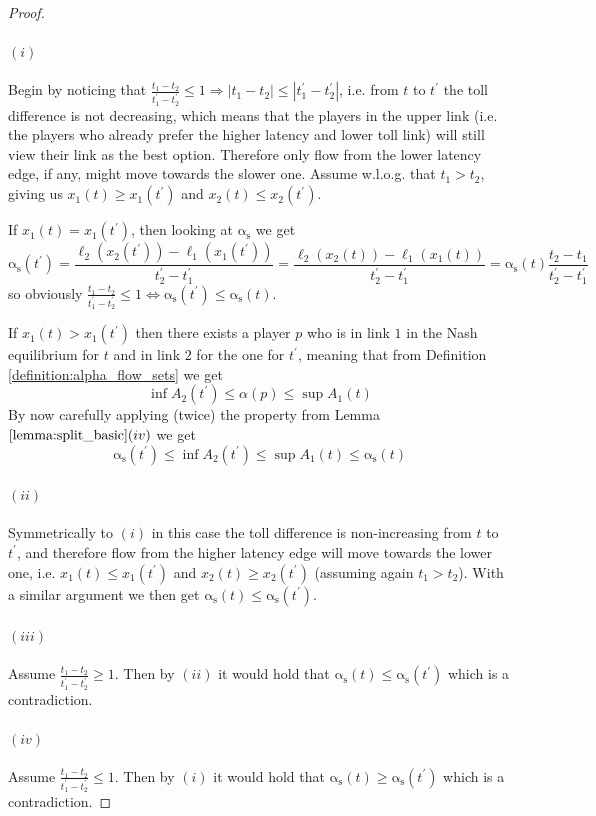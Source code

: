 \documentclass[10pt,a4paper]{book}
\newcommand{\as}{\mathrm{\alpha_s}}
\theoremstyle{definition}
\theoremstyle{comment}
\begin{document}
\begin{proof}
	$ $
	\paragraph{$(i)$}
	Begin by noticing that $\frac{t_1 - t_2}{t_1^\prime - t_2^\prime} \le 1 \Rightarrow |t_1 - t_2| \le |t_1^\prime - t_2^\prime|$, i.e. from $t$ to $t^\prime$ the toll difference is not decreasing, which means that the players in the upper link (i.e. the players who already prefer the higher latency and lower toll link) will still view their link as the best option.
	Therefore only flow from the lower latency edge, if any, might move towards the slower one.
	Assume w.l.o.g. that $t_1 > t_2$, giving us $x_1(t) \ge x_1(t^\prime)$ and $x_2(t) \le x_2(t^\prime)$.

	If $x_1(t) = x_1(t^\prime)$, then looking at $\as$ we get
	\[\as(t^\prime) = \frac{\ell_2(x_2(t^\prime)) - \ell_1(x_1(t^\prime))}{t_2^\prime - t_1^\prime} = \frac{\ell_2(x_2(t)) - \ell_1(x_1(t))}{t_2^\prime - t_1^\prime} = \as(t) \frac{t_2 - t_1}{t_2^\prime - t_1^\prime}\]
	so obviously $\frac{t_1 - t_2}{t_1^\prime - t_2^\prime} \le 1 \Leftrightarrow \as(t^\prime) \le \as(t)$.

	If $x_1(t) > x_1(t^\prime)$ then there exists a player $p$ who is in link $1$ in the Nash equilibrium for $t$ and in link $2$ for the one for $t^\prime$, meaning that from Definition \ref{definition:alpha_flow_sets} we get
	\[\inf A_2(t^\prime) \le \alpha(p) \le \sup A_1(t)\]
	By now carefully applying  (twice) the property from Lemma $\ref{lemma:split_basic}(iv)$ we get
	\[\as(t^\prime) \le \inf A_2(t^\prime) \le \sup A_1(t) \le \as(t)\]

	\paragraph{$(ii)$}
	Symmetrically to $(i)$ in this case the toll difference is non-increasing from $t$ to $t^\prime$, and therefore flow from the higher latency edge will move towards the lower one, i.e. $x_1(t) \le x_1(t^\prime)$ and $x_2(t) \ge x_2(t^\prime)$ (assuming again $t_1 > t_2$).
	With a similar argument we then get $\as(t) \le \as(t^\prime)$.

	\paragraph{$(iii)$}
	Assume $\frac{t_1 - t_2}{t_1^\prime - t_2^\prime} \ge 1$.
	Then by $(ii)$ it would hold that $\as(t) \le \as(t^\prime)$ which is a contradiction.

	\paragraph{$(iv)$}
	Assume $\frac{t_1 - t_2}{t_1^\prime - t_2^\prime} \le 1$.
	Then by $(i)$ it would hold that $\as(t) \ge \as(t^\prime)$ which is a contradiction.
\end{proof}
\end{document}
